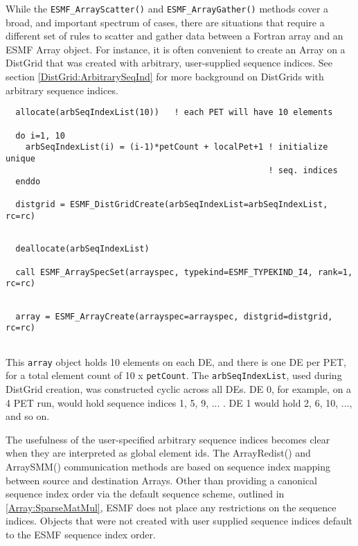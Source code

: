    While the {\tt ESMF\_ArrayScatter()} and {\tt ESMF\_ArrayGather()} methods
   cover a broad, and important spectrum of cases, there are situations that
   require a different set of rules to scatter and gather data between a
   Fortran array and an ESMF Array object. For instance, it is often convenient
   to create an Array on a DistGrid that was created with arbitrary,
   user-supplied sequence indices. See section \ref{DistGrid:ArbitrarySeqInd}
   for more background on DistGrids with arbitrary sequence indices. 

 \begin{verbatim}
  allocate(arbSeqIndexList(10))   ! each PET will have 10 elements
  
  do i=1, 10
    arbSeqIndexList(i) = (i-1)*petCount + localPet+1 ! initialize unique 
                                                     ! seq. indices
  enddo
  
  distgrid = ESMF_DistGridCreate(arbSeqIndexList=arbSeqIndexList, rc=rc)
 
\end{verbatim}
 

 \begin{verbatim}
  deallocate(arbSeqIndexList)
  
  call ESMF_ArraySpecSet(arrayspec, typekind=ESMF_TYPEKIND_I4, rank=1, rc=rc)
 
\end{verbatim}
 

 \begin{verbatim}
  array = ESMF_ArrayCreate(arrayspec=arrayspec, distgrid=distgrid, rc=rc)
 
\end{verbatim}
 

   This {\tt array} object holds 10 elements on each DE, and there is one DE
   per PET, for a total element count of 10 x {\tt petCount}. The
   {\tt arbSeqIndexList}, used during DistGrid creation, was constructed cyclic
   across all DEs. DE 0, for example, on a 4 PET run, would hold sequence
   indices 1, 5, 9, ... . DE 1 would hold 2, 6, 10, ..., and so on.
  
   The usefulness of the user-specified arbitrary sequence indices becomes
   clear when they are interpreted as global element ids. The ArrayRedist()
   and ArraySMM() communication methods are based on sequence index mapping
   between source and destination Arrays. Other than providing a canonical
   sequence index order via the default sequence scheme, outlined in
   \ref{Array:SparseMatMul}, ESMF does not place any restrictions on the
   sequence indices. Objects that were not created with user supplied
   sequence indices default to the ESMF sequence index order.
  
